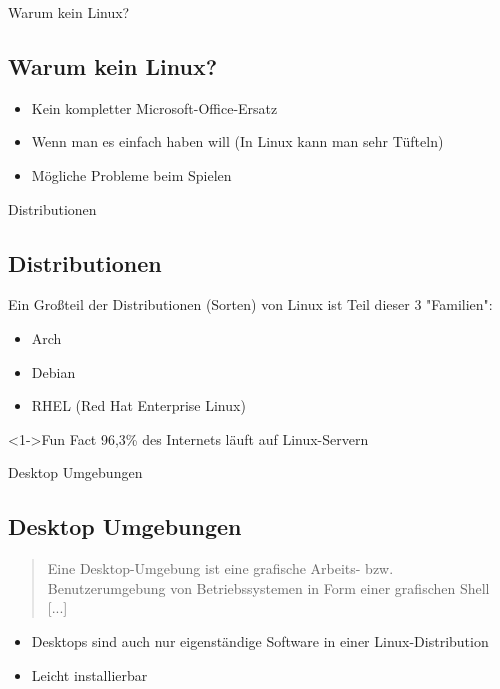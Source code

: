 \begin{frame}{Warum kein Linux?}
    \subsection{Warum kein Linux?}\label{subsec:warum-kein-linux?}

    \begin{itemize}
        \item Kein kompletter Microsoft-Office-Ersatz
        \item Wenn man es einfach haben will (In Linux kann man sehr Tüfteln)
        \item Mögliche Probleme beim Spielen
    \end{itemize}

\end{frame}

\begin{frame}{Distributionen}
    \subsection{Distributionen}\label{subsec:distributionen}

    Ein Großteil der Distributionen (Sorten) von Linux ist Teil dieser 3 "Familien":

    \pause

    \begin{itemize}
        \item Arch
        \item Debian
        \item RHEL (Red Hat Enterprise Linux)
    \end{itemize}

    \begin{exampleblock}<1->{Fun Fact}
        96,3\% des Internets läuft auf Linux-Servern
    \end{exampleblock}

\end{frame}


\begin{frame}{Desktop Umgebungen}
    \subsection{Desktop Umgebungen}\label{subsec:desktop-umgebungen}

    \begin{quote}
        Eine Desktop-Umgebung ist eine grafische Arbeits- bzw. Benutzerumgebung von Betriebssystemen in Form einer grafischen Shell [...]
    \end{quote}

    \begin{itemize}
        \item Desktops sind auch nur eigenständige Software in einer Linux-Distribution
        \item Leicht installierbar
    \end{itemize}

\end{frame}

